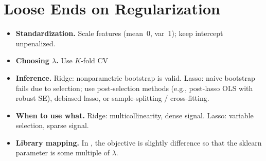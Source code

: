 \section{Loose Ends on Regularization}


\begin{itemize}
\item \textbf{Standardization.} Scale features (mean~0, var~1); keep intercept unpenalized.
\item \textbf{Choosing $\lambda$.} Use $K$-fold CV
\item \textbf{Inference.} Ridge: nonparametric bootstrap is valid. Lasso: naive bootstrap fails due to selection; use post-selection methods (e.g., post-lasso OLS with robust SE), debiased lasso, or sample-splitting / cross-fitting.
\item \textbf{When to use what.} Ridge: multicollinearity, dense signal. Lasso: variable selection, sparse signal.
\item \textbf{Library mapping.} In , the objective is slightly difference so that the sklearn parameter  is some multiple of $\lambda$. 
\end{itemize}